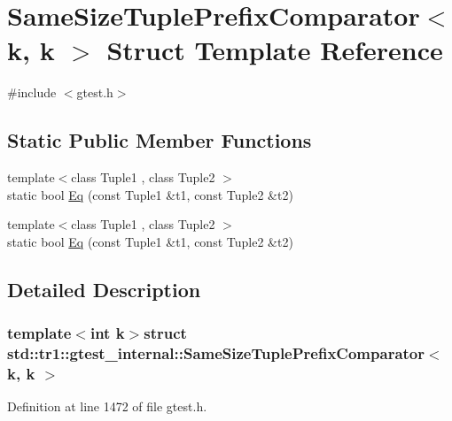 \hypertarget{structstd_1_1tr1_1_1gtest__internal_1_1SameSizeTuplePrefixComparator_3_01k_00_01k_01_4}{\section{\-Same\-Size\-Tuple\-Prefix\-Comparator$<$ k, k $>$ \-Struct \-Template \-Reference}
\label{d9/d6b/structstd_1_1tr1_1_1gtest__internal_1_1SameSizeTuplePrefixComparator_3_01k_00_01k_01_4}
}


{\ttfamily \#include $<$gtest.\-h$>$}

\subsection*{\-Static \-Public \-Member \-Functions}
\begin{DoxyCompactItemize}
\item 
{\footnotesize template$<$class Tuple1 , class Tuple2 $>$ }\\static bool \hyperlink{structstd_1_1tr1_1_1gtest__internal_1_1SameSizeTuplePrefixComparator_3_01k_00_01k_01_4_aebc835a1d92a0885ef27f32d38e7ce05}{\-Eq} (const \-Tuple1 \&t1, const \-Tuple2 \&t2)
\item 
{\footnotesize template$<$class Tuple1 , class Tuple2 $>$ }\\static bool \hyperlink{structstd_1_1tr1_1_1gtest__internal_1_1SameSizeTuplePrefixComparator_3_01k_00_01k_01_4_aebc835a1d92a0885ef27f32d38e7ce05}{\-Eq} (const \-Tuple1 \&t1, const \-Tuple2 \&t2)
\end{DoxyCompactItemize}


\subsection{\-Detailed \-Description}
\subsubsection*{template$<$int k$>$struct std\-::tr1\-::gtest\-\_\-internal\-::\-Same\-Size\-Tuple\-Prefix\-Comparator$<$ k, k $>$}



\-Definition at line 1472 of file gtest.\-h.



